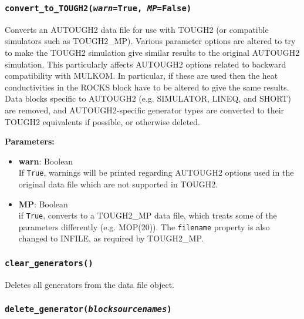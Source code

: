 \begin{snugshade}
\subsubsection{\texttt{convert\_to\_TOUGH2(\emph{warn}=True, \emph{MP}=False)}}
\end{snugshade}
\label{sec:t2data:convert_to_TOUGH2}

Converts an AUTOUGH2 data file for use with TOUGH2 (or compatible simulators such as TOUGH2\_MP).  Various parameter options are altered to try to make the TOUGH2 simulation give similar results to the original AUTOUGH2 simulation.  This particularly affects AUTOUGH2 options related to backward compatibility with MULKOM.  In particular, if these are used then the heat conductivities in the ROCKS block have to be altered to give the same results.  Data blocks specific to AUTOUGH2 (e.g. SIMULATOR, LINEQ, and SHORT) are removed, and AUTOUGH2-specific generator types are converted to their TOUGH2 equivalents if possible, or otherwise deleted.

\textbf{Parameters:}
\begin{itemize}
\item \textbf{warn}: Boolean\\
  If \texttt{True}, warnings will be printed regarding AUTOUGH2 options used in the original data file which are not supported in TOUGH2.
\item \textbf{MP}: Boolean\\
  if \texttt{True}, converts to a TOUGH2\_MP data file, which treats some of the parameters differently (e.g. MOP(20)).  The \texttt{filename} property is also changed to INFILE, as required by TOUGH2\_MP. 
\end{itemize}

\begin{snugshade}
\subsubsection{\texttt{clear\_generators()}}
\end{snugshade}
\label{sec:t2data:clear_generators}

Deletes all generators from the data file object.

\begin{snugshade}
\subsubsection{\texttt{delete\_generator(\emph{blocksourcenames})}}
\end{snugshade}
\label{sec:t2data:delete_generator}

